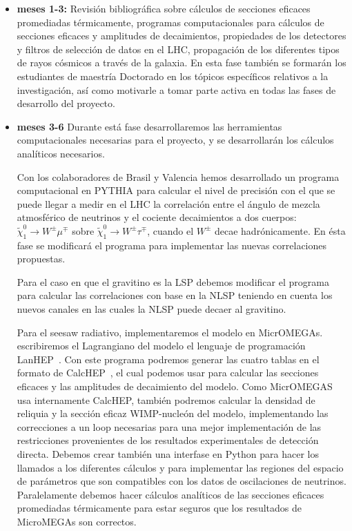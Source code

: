 \begin{itemize}
\item \textbf{meses 1-3:} Revisión bibliográfica sobre cálculos de
  secciones eficaces promediadas térmicamente, programas
  computacionales para cálculos de secciones eficaces y amplitudes de
  decaimientos, propiedades de los detectores y filtros de selección
  de datos en el LHC, propagación de los diferentes tipos de rayos
  cósmicos a través de la galaxia.  En esta fase también se formarán los
  estudiantes  de maestría Doctorado en los tópicos específicos relativos a la
  investigación, así como motivarle a tomar parte activa en todas las
  fases de desarrollo del proyecto.

\item \textbf{meses 3-6} Durante está fase desarrollaremos las
  herramientas computacionales necesarias para el proyecto, y se
  desarrollarán los cálculos analíticos necesarios.

\begin{brpvlhc}
  Con los colaboradores de Brasil y Valencia hemos desarrollado un
  programa computacional en PYTHIA para calcular el nivel de precisión
  con el que se puede llegar a medir en el LHC la correlación entre el
  ángulo de mezcla atmosférico de neutrinos y el cociente decaimientos
  a dos cuerpos: $\tilde\chi_1^0\to W^\pm\mu^\mp$ sobre
  $\tilde\chi_1^0\to W^\pm\tau^\mp$, cuando el $W^\pm$ decae
  hadrónicamente.  En ésta fase se modificará el programa para
  implementar las nuevas correlaciones propuestas.
\end{brpvlhc}

\begin{gravitinodm}
  Para el caso en que el gravitino es la LSP debemos modificar el
  programa para calcular las correlaciones con base en la NLSP
  teniendo en cuenta los nuevos canales en las cuales la NLSP puede
  decaer al gravitino.
\end{gravitinodm}



\begin{darkmatter}
  Para el seesaw radiativo, implementaremos el modelo en MicrOMEGAs.
  escribiremos el Lagrangiano del modelo el lenguaje de programación
  LanHEP~\cite{Semenov:2008jy}. Con este programa podremos generar las
  cuatro tablas en el formato de CalcHEP~\cite{Pukhov:2004ca}, el cual
  podemos usar para calcular las secciones eficaces y las amplitudes
  de decaimiento del modelo.  Como MicrOMEGAS usa internamente
  CalcHEP, también podremos calcular la densidad de reliquia y la
  sección eficaz WIMP-nucleón del modelo, implementando las
  correcciones a un loop necesarias para una mejor implementación de
  las restricciones provenientes de los resultados experimentales de
  detección directa. Debemos crear también una interfase en Python
  para hacer los llamados a los diferentes cálculos y para implementar
  las regiones del espacio de parámetros que son compatibles con los
  datos de oscilaciones de neutrinos. Paralelamente debemos hacer
  cálculos analíticos de las secciones eficaces promediadas
  térmicamente para estar seguros que los resultados de MicroMEGAs son
  correctos.
\end{darkmatter}


\end{itemize}
